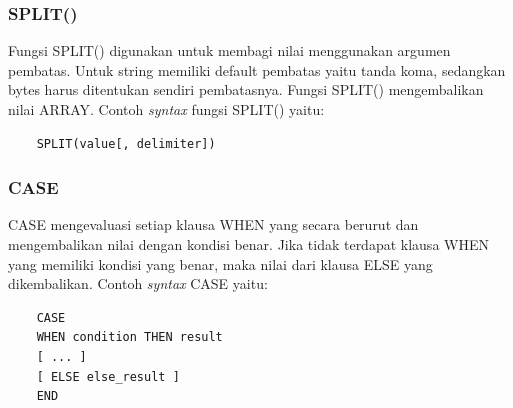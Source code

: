 \subsubsection{SPLIT()}
Fungsi SPLIT() digunakan untuk membagi nilai menggunakan argumen pembatas. Untuk string memiliki default pembatas yaitu tanda koma, sedangkan bytes harus ditentukan sendiri pembatasnya. Fungsi SPLIT() mengembalikan nilai ARRAY. Contoh \textit{syntax} fungsi SPLIT() yaitu:
\begin{verbatim}
	SPLIT(value[, delimiter])
\end{verbatim}

\subsubsection{CASE}
CASE mengevaluasi setiap klausa WHEN yang secara berurut dan mengembalikan nilai dengan kondisi benar. Jika tidak terdapat klausa WHEN yang memiliki kondisi yang benar, maka nilai dari klausa ELSE yang dikembalikan. Contoh \textit{syntax} CASE yaitu:
\begin{verbatim}
	CASE
	WHEN condition THEN result
	[ ... ]
	[ ELSE else_result ]
	END
\end{verbatim}

